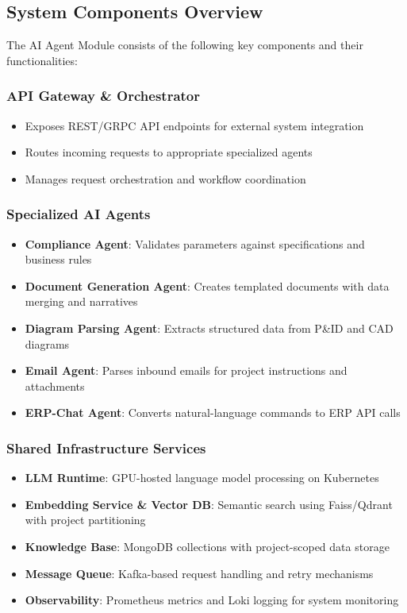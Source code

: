 \documentclass[12pt]{report}
\begin{document}
\subsection{System Components Overview}
The AI Agent Module consists of the following key components and their functionalities:

\subsubsection{API Gateway \& Orchestrator}
\begin{itemize}
  \item Exposes REST/GRPC API endpoints for external system integration
  \item Routes incoming requests to appropriate specialized agents
  \item Manages request orchestration and workflow coordination
\end{itemize}

\subsubsection{Specialized AI Agents}
\begin{itemize}
  \item \textbf{Compliance Agent}: Validates parameters against specifications and business rules
  \item \textbf{Document Generation Agent}: Creates templated documents with data merging and narratives
  \item \textbf{Diagram Parsing Agent}: Extracts structured data from P\&ID and CAD diagrams
  \item \textbf{Email Agent}: Parses inbound emails for project instructions and attachments
  \item \textbf{ERP-Chat Agent}: Converts natural-language commands to ERP API calls
\end{itemize}

\subsubsection{Shared Infrastructure Services}
\begin{itemize}
  \item \textbf{LLM Runtime}: GPU-hosted language model processing on Kubernetes
  \item \textbf{Embedding Service \& Vector DB}: Semantic search using Faiss/Qdrant with project partitioning
  \item \textbf{Knowledge Base}: MongoDB collections with project-scoped data storage
  \item \textbf{Message Queue}: Kafka-based request handling and retry mechanisms
  \item \textbf{Observability}: Prometheus metrics and Loki logging for system monitoring
\end{itemize}
\end{document}

